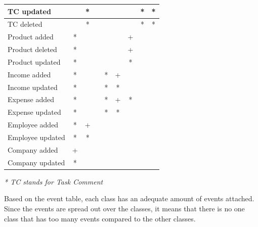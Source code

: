 \begin{tabular}{|l||c|c|c|c|c|c|c|c|}
   TC updated                      &         &    *     &         &          &         &         &   *     &   *             \\\hline
   TC deleted                      &         &    *     &         &          &         &         &   *     &   *             \\\hline
   Product added                   &    *    &          &         &          &         &    +    &         &                 \\\hline
   Product deleted                 &    *    &          &         &          &         &    +    &         &                 \\\hline
   Product updated                 &    *    &          &         &          &         &    *    &         &                 \\\hline
   Income added                    &    *    &          &         &     *    &    +    &         &         &                 \\\hline
   Income updated                  &    *    &          &         &     *    &    *    &         &         &                 \\\hline
   Expense added                   &    *    &          &         &     *    &    +    &    *    &         &                 \\\hline
   Expense updated                 &    *    &          &         &     *    &    *    &         &         &                 \\\hline
   Employee added                  &    *    &    +     &         &          &         &         &         &                 \\\hline
   Employee updated                &    *    &    *     &         &          &         &         &         &                 \\\hline
   Company added                   &    +    &          &         &          &         &         &         &                 \\\hline
   Company updated                 &    *    &          &         &          &         &         &         &                 \\
  \hline
\end{tabular}
\textit{* TC stands for Task Comment}
                                                                                                                                 
Based on the event table, each class has an adequate amount of events attached. Since the events are spread out over the classes, it means that there is no one class that has too many events compared to the other classes. %

